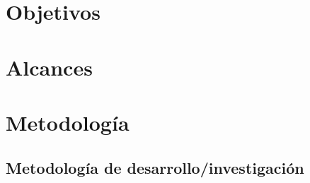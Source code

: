 \documentclass[11pt,letterpaper]{article}
\begin{document}



\section{Objetivos}





\section{Alcances}




\section{Metodología}

\subsection{Metodología de desarrollo/investigación}

\end{document}
